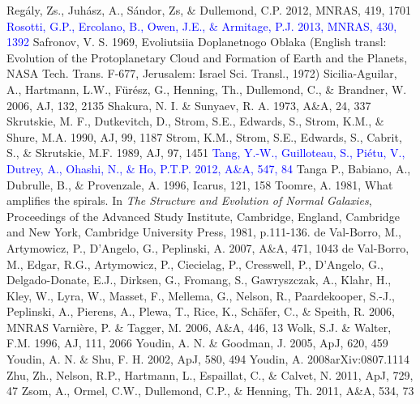 \documentclass[apj]{emulateapj}
\def\blue#1{\textcolor{blue}{#1}}
\begin{document}
\begin{thebibliography}{}
 Reg\'aly, Zs., Juh\'asz, A., S\'andor, Zs, \& Dullemond, C.P. 2012, MNRAS, 419, 1701
\bibitem[{{\blue{Rosotti et al.}}(2013)}]{Rosotti13} \blue{Rosotti, G.P., Ercolano, B., Owen, J.E., \& Armitage, P.J. 2013, MNRAS, 430, 1392} 
 Safronov, V. S. 1969, Evoliutsiia Doplanetnogo Oblaka (English transl: Evolution of the Protoplanetary Cloud and Formation of Earth and the Planets, NASA Tech. Trans. F-677, Jerusalem: Israel Sci. Transl., 1972)
 Sicilia-Aguilar, A., Hartmann, L.W., F\"ur\'esz, G., Henning, Th., Dullemond, C., \& Brandner, W. 2006, AJ, 132, 2135
 Shakura, N. I. \& Sunyaev, R. A. 1973, A\&A, 24, 337
 Skrutskie, M. F., Dutkevitch, D., Strom, S.E., Edwards, S., Strom, K.M., \& Shure, M.A. 1990, AJ, 99, 1187
 Strom, K.M., Strom, S.E., Edwards, S., Cabrit, S., \& Skrutskie, M.F. 1989, AJ, 97, 1451
\bibitem[{{\blue{Tang et al.}}(2012)}]{Tang12} \blue{Tang, Y.-W., Guilloteau, S., Pi\'etu, V., Dutrey, A., Ohashi, N., \& Ho, P.T.P. 2012, A\&A, 547, 84}
 Tanga P., Babiano, A., Dubrulle, B., \& Provenzale, A. 1996, Icarus, 121, 158
 Toomre, A. 1981, What amplifies the spirals. In {\it The Structure and Evolution of Normal Galaxies}, Proceedings of the Advanced Study Institute, Cambridge, England, Cambridge and New York, Cambridge University Press, 1981, p.111-136.
de Val-Borro, M., Artymowicz, P., D'Angelo, G., Peplinski, A. 2007, A\&A, 471, 1043
de Val-Borro, M., Edgar, R.G., Artymowicz, P., Ciecielag, P., Cresswell, P., D'Angelo, G., Delgado-Donate, E.J., Dirksen, G., Fromang, S., Gawryszczak, A., Klahr, H., Kley, W., Lyra, W., Masset, F., Mellema, G., Nelson, R., Paardekooper, S.-J., Peplinski, A., Pierens, A., Plewa, T., Rice, K., Sch\"afer, C., \& Speith, R. 2006, MNRAS
 Varni\`ere, P. \& Tagger, M. 2006, A\&A, 446, 13
 Wolk, S.J. \& Walter, F.M. 1996, AJ, 111, 2066
 Youdin, A. N. \& Goodman, J. 2005, ApJ, 620, 459
 Youdin, A. N. \& Shu, F. H. 2002, ApJ, 580, 494
 Youdin, A. 2008arXiv:0807.1114
 Zhu, Zh., Nelson, R.P., Hartmann, L.,  Espaillat, C., \& Calvet, N. 2011, ApJ, 729, 47
 Zsom, A., Ormel, C.W., Dullemond, C.P., \& Henning, Th. 2011, A\&A, 534, 73
\end{thebibliography}
\end{document}

